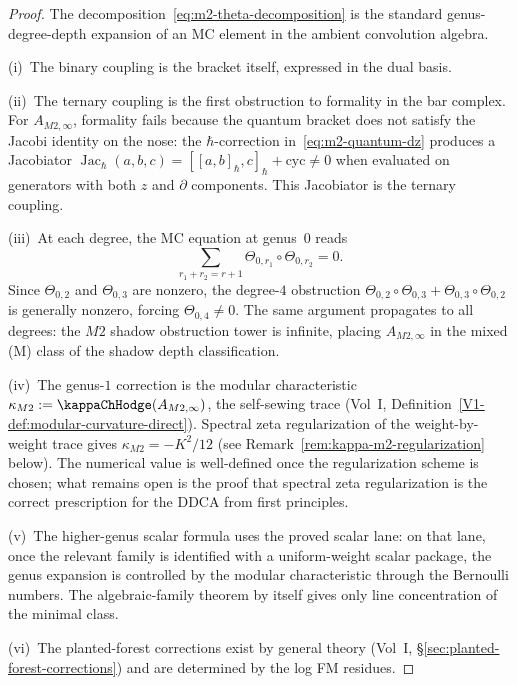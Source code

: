 \begin{proof}
The decomposition~\eqref{eq:m2-theta-decomposition} is the
standard genus-degree-depth expansion of an MC element in the
ambient convolution algebra.

(i)~The binary coupling is the bracket itself, expressed in the
dual basis.

(ii)~The ternary coupling is the first obstruction to formality
in the bar complex. For $A_{M2,\infty}$, formality fails because
the quantum bracket does not satisfy the Jacobi identity on the nose:
the $\hbar$-correction in~\eqref{eq:m2-quantum-dz} produces
a Jacobiator $\operatorname{Jac}_\hbar(a,b,c)
= [[a,b]_\hbar,c]_\hbar + \text{cyc} \neq 0$
when evaluated on generators with both $z$ and $\partial$
components. This Jacobiator is the ternary coupling.

(iii)~At each degree, the MC equation at genus~$0$ reads
\[
\sum_{r_1+r_2=r+1}\Theta_{0,r_1}\circ\Theta_{0,r_2} = 0.
\]
Since $\Theta_{0,2}$ and $\Theta_{0,3}$ are nonzero, the
degree-$4$ obstruction
$\Theta_{0,2}\circ\Theta_{0,3}+\Theta_{0,3}\circ\Theta_{0,2}$
is generally nonzero, forcing $\Theta_{0,4}\neq 0$. The same
argument propagates to all degrees: the $M2$ shadow obstruction tower is
infinite, placing $A_{M2,\infty}$ in the mixed (M) class of
the shadow depth classification.

(iv)~The genus-$1$ correction is the modular characteristic
$\kappa_{M2} := \kappaChHodge(A_{M2,\infty})$, the self-sewing trace
(Vol~I, Definition~\ref*{V1-def:modular-curvature-direct}).
Spectral zeta regularization of the weight-by-weight trace
gives $\kappa_{M2} = -K^2/12$ (see
Remark~\ref{rem:kappa-m2-regularization} below).
The numerical value is well-defined once the regularization
scheme is chosen; what remains open is the proof that spectral
zeta regularization is the correct prescription for the DDCA
from first principles.

(v)~The higher-genus scalar formula uses the proved scalar lane:
on that lane, once the relevant family is identified with a
uniform-weight scalar package, the genus expansion is controlled by
the modular characteristic through the Bernoulli numbers. The
algebraic-family theorem by itself gives only line concentration of
the minimal class.

(vi)~The planted-forest corrections exist by general theory
(Vol~I, \S\ref*{sec:planted-forest-corrections}) and are
determined by the log FM residues.
\end{proof}

